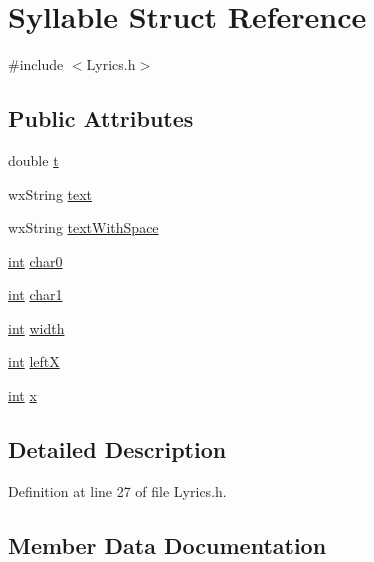 \hypertarget{struct_syllable}{}\section{Syllable Struct Reference}
\label{struct_syllable}


{\ttfamily \#include $<$Lyrics.\+h$>$}

\subsection*{Public Attributes}
\begin{DoxyCompactItemize}
\item 
double \hyperlink{struct_syllable_a8bda2fd870861df184ec61fd0d5c4f24}{t}
\item 
wx\+String \hyperlink{struct_syllable_a59be29e552e2652ec239635fee387ba7}{text}
\item 
wx\+String \hyperlink{struct_syllable_a7a39786f83b0ace0db6d80f9ee7c7f61}{text\+With\+Space}
\item 
\hyperlink{xmltok_8h_a5a0d4a5641ce434f1d23533f2b2e6653}{int} \hyperlink{struct_syllable_adc9a564a55ae8b2b3ca6dbffeef8d7db}{char0}
\item 
\hyperlink{xmltok_8h_a5a0d4a5641ce434f1d23533f2b2e6653}{int} \hyperlink{struct_syllable_acb38e4d950a9a8a2b0f726806bfa6702}{char1}
\item 
\hyperlink{xmltok_8h_a5a0d4a5641ce434f1d23533f2b2e6653}{int} \hyperlink{struct_syllable_a3a15aef28e67d8cebe93baa93d1869ed}{width}
\item 
\hyperlink{xmltok_8h_a5a0d4a5641ce434f1d23533f2b2e6653}{int} \hyperlink{struct_syllable_a2c41f08cff808a46566a5c477d738e53}{leftX}
\item 
\hyperlink{xmltok_8h_a5a0d4a5641ce434f1d23533f2b2e6653}{int} \hyperlink{struct_syllable_a2697c1ab411491228ed5ab109f32c653}{x}
\end{DoxyCompactItemize}


\subsection{Detailed Description}


Definition at line 27 of file Lyrics.\+h.



\subsection{Member Data Documentation}
